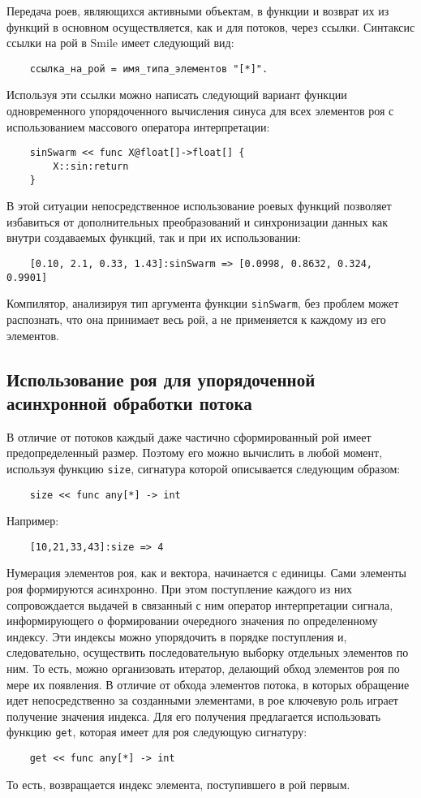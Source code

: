 Передача роев, являющихся активными объектам, в функции и возврат их из функций в основном осуществляется, как и для потоков, через ссылки. Синтаксис ссылки на рой в Smile имеет следующий вид:
\begin{verbatim}
    ссылка_на_рой = имя_типа_элементов "[*]".
\end{verbatim}
Используя эти ссылки можно написать следующий вариант функции одновременного упорядоченного вычисления синуса для всех элементов роя с использованием массового оператора интерпретации:
\begin{verbatim}
    sinSwarm << func X@float[]->float[] {
        X::sin:return
    }
\end{verbatim}
В этой ситуации непосредственное использование роевых функций позволяет избавиться от дополнительных преобразований и синхронизации данных как внутри создаваемых функций, так и при их использовании:
\begin{verbatim}
    [0.10, 2.1, 0.33, 1.43]:sinSwarm => [0.0998, 0.8632, 0.324, 0.9901]
\end{verbatim}
Компилятор, анализируя тип аргумента функции \texttt{sinSwarm}, без проблем может распознать, что она принимает весь рой, а не применяется к каждому из его элементов.

\subsection{Использование роя для упорядоченной асинхронной обработки потока}

В отличие от потоков каждый даже частично сформированный рой имеет предопределенный размер. Поэтому его можно вычислить в любой момент, используя функцию \texttt{size}, сигнатура которой описывается следующим образом:
\begin{verbatim}
    size << func any[*] -> int
\end{verbatim}
Например:
\begin{verbatim}
    [10,21,33,43]:size => 4
\end{verbatim}
Нумерация элементов роя, как и вектора, начинается с единицы. Сами элементы роя формируются асинхронно. При этом поступление каждого из них сопровождается выдачей в связанный с ним оператор интерпретации сигнала, информирующего о формировании очередного значения по определенному индексу. Эти индексы можно упорядочить в порядке поступления и, следовательно, осуществить последовательную выборку отдельных элементов по ним. То есть, можно организовать итератор, делающий обход элементов роя по мере их появления. В отличие от обхода элементов потока, в которых обращение идет непосредственно за созданными элементами, в рое ключевую роль играет получение значения индекса. Для его получения предлагается использовать функцию \texttt{get}, которая имеет для роя следующую сигнатуру:
\begin{verbatim}
    get << func any[*] -> int
\end{verbatim}
То есть, возвращается индекс элемента, поступившего в рой первым.

